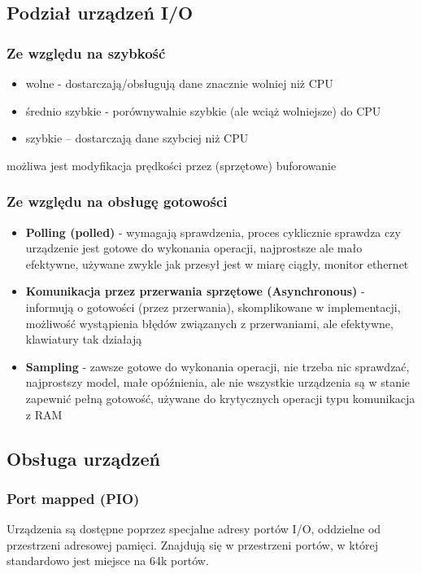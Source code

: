 
\subsection{Podział urządzeń I/O}

\subsubsection{Ze względu na szybkość}
\begin{itemize}
    \item wolne - dostarczają/obsługują dane znacznie wolniej niż CPU
    \item średnio szybkie - porównywalnie szybkie (ale wciąż wolniejsze) do CPU
    \item szybkie -- dostarczają dane szybciej niż CPU
\end{itemize}
możliwa jest modyfikacja prędkości przez (sprzętowe) buforowanie

\subsubsection{Ze względu na obsługę gotowości}
\begin{itemize}
    \item \textbf{Polling (polled)} - wymagają sprawdzenia, proces cyklicznie sprawdza czy urządzenie jest gotowe do wykonania operacji, najprostsze ale mało efektywne, używane zwykle jak przesył jest w miarę ciągły, monitor ethernet
    \item \textbf{Komunikacja przez przerwania sprzętowe (Asynchronous)} - informują o gotowości (przez przerwania), skomplikowane w implementacji, możliwość wystąpienia błędów związanych z przerwaniami, ale efektywne, klawiatury tak działają
    \item \textbf{Sampling} - zawsze gotowe do wykonania operacji, nie trzeba nic sprawdzać, najprostszy model, małe opóźnienia, ale nie wszystkie urządzenia są w stanie zapewnić pełną gotowość, używane do krytycznych operacji typu komunikacja z RAM
\end{itemize}

\subsection{Obsługa urządzeń}
\subsubsection{Port mapped (PIO)}
Urządzenia są dostępne poprzez specjalne adresy portów I/O, oddzielne od przestrzeni adresowej pamięci. Znajdują się w przestrzeni portów, w której standardowo jest miejsce na 64k portów.

